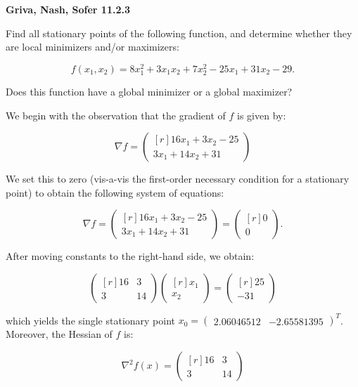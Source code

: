 \textbf{Griva, Nash, Sofer 11.2.3}

Find all stationary points of the following function, and determine whether they are local minimizers and/or maximizers:

$$
f(x_1, x_2) = 8x_1^2 + 3 x_1 x_2 + 7 x_2^2 - 25 x_1 + 31 x_2 - 29.
$$

Does this function have a global minimizer or a global maximizer?

\begin{solution}
    We begin with the observation that the gradient of $f$ is given by:

    $$
    \nabla f = \begin{pmatrix*}[r]
        16 x_1 + 3 x_2 - 25 \\
        3 x_1 + 14 x_2 + 31
    \end{pmatrix*}
    $$

    We set this to zero (vis-a-vis the first-order necessary condition for a stationary point) to obtain the following 
    system of equations:

    $$
    \nabla f = \begin{pmatrix*}[r]
        16 x_1 + 3 x_2 - 25 \\
        3 x_1 + 14 x_2 + 31
    \end{pmatrix*} = \begin{pmatrix*}[r]
        0 \\
        0
    \end{pmatrix*}.
    $$

    After moving constants to the right-hand side, we obtain:

    $$
    \begin{pmatrix*}[r]
        16 & 3 \\
        3  & 14
    \end{pmatrix*} \begin{pmatrix*}[r]
        x_1 \\
        x_2
    \end{pmatrix*} = \begin{pmatrix*}[r]
        25 \\
       -31
    \end{pmatrix*}
    $$

    which yields the single stationary point $x_0 = \begin{pmatrix} 2.06046512 & -2.65581395 \end{pmatrix}^T$. Moreover,
    the Hessian of $f$ is:

    $$
    \nabla^2 f(x) = \begin{pmatrix*}[r]
        16 & 3 \\
        3  & 14
    \end{pmatrix*}
    $$


\end{solution}
